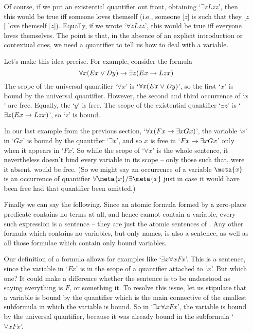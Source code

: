 Of course, if we put an existential quantifier out front, obtaining `$\exists zLzz$', then this would be true iff someone loves themself (i.e., someone [$z$] is such that they [$z$] love themself [$z$]). Equally, if we wrote `$\forall z Lzz$', this would be true iff everyone loves themselves. The point is that, in the absence of an explicit introduction or contextual cues, we need a quantifier to tell us how to deal with a variable. 

Let's make this idea precise.
For example, consider the formula
	$$\forall x(Ex \vee Dy) \rightarrow \exists z(Ex \rightarrow Lzx)$$
The scope of the universal quantifier `$\forall x$' is `$\forall x (Ex \vee Dy)$', so the first `$x$' is bound by the universal quantifier. However, the second and third occurrence of `$x$' are free. Equally, the `$y$' is free. The scope of the existential quantifier `$\exists z$' is `$\exists z(Ex \rightarrow Lzx)$', so `$z$' is bound. 

In our last example from the previous section, `$\forall x (Fx \rightarrow \exists xGx)$', the variable `$x$' in `$Gx$' is bound by the quantifier `$\exists x$', and so $x$ is free in `$Fx \rightarrow \exists x Gx$' only when it appears in `$Fx$'. So while the scope of `$\forall x$' is the whole sentence, it nevertheless doesn't bind every variable in its scope – only those such that, were it absent, would be free. (So we might say an occurrence of a variable $\meta{x}$ is  an occurrence of quantifier $\forall \meta{x}/\exists \meta{x}$ just in case it would have been free had that quantifier been omitted.) 


Finally we can say the following.	
Since an atomic formula formed by a zero-place predicate contains no terms at all, and hence cannot contain a variable, every such expression is a sentence – they are just the atomic sentences of \TFL. Any other formula which contains no variables, but only names, is also a sentence, as well as all those formulae which contain only bound variables. 

Our definition of a formula allows for examples like `$\exists x \forall x Fx$'. This is a sentence, since the variable in `$Fx$' is in the scope of a quantifier attached to `$x$'. But which one? It could make a difference whether the sentence is to be understood as saying everything is $F$, or something it. To resolve this issue, let us stipulate that a variable is bound by the quantifier which is the main connective of the smallest subformula in which the variable is bound. So in `$\exists x \forall x Fx$', the variable is bound by the universal quantifier, because it was already bound in the subformula `$\forall x Fx$'.


